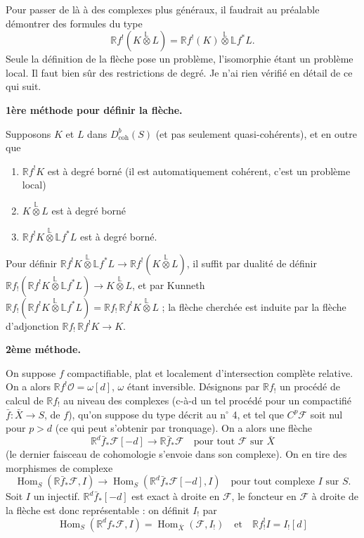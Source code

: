 \documentclass[12pt]{amsart}
\theoremstyle{plain}
\theoremstyle{definition}
\DeclareMathOperator{\Hom}{Hom}
\newcommand{\coh}{\text{coh}}
\newcommand{\cF}{\mathcal{F}}
\newcommand{\cO}{\mathcal{O}}
\newcommand{\cDb}{D^{b}}
\newcommand{\bR}{\mathbb{R}}
\newcommand{\bL}{\mathbb{L}}
\begin{document}
Pour passer de l\`a \`a des complexes plus g\'en\'eraux, il faudrait au pr\'ealable d\'emontrer des formules du type
\[
\bR f^{!}(K \overset{\mathbb{L}}{\otimes} L) = \bR f^{!}(K) \overset{\mathbb{L}}{\otimes} \bL f^{*}L.
\]
Seule la d\'efinition de la fl\`eche pose un probl\`eme, l'isomorphie \'etant un probl\`eme local. Il faut bien s\^ur des restrictions de degr\'e. Je n'ai rien v\'erifi\'e en d\'etail de ce qui suit.

\textbf{1\`ere m\'ethode pour d\'efinir la fl\`eche.}

Supposons $K$ et $L$ dans $\cDb_{\coh}(S)$ (et pas seulement quasi-coh\'erents), et en outre que
\begin{enumerate}
\item[a)] $\bR f^{!}K$ est \`a degr\'e born\'e (il est automatiquement coh\'erent, c'est un probl\`eme local)
\item[b)] $K \overset{\mathbb{L}}{\otimes} L$ est \`a degr\'e born\'e
\item[c)] $\bR f^{!}K \overset{\mathbb{L}}{\otimes} \bL f^{*}L$ est \`a degr\'e born\'e.
\end{enumerate}

Pour d\'efinir $\bR f^{!}K \overset{\mathbb{L}}{\otimes} \bL f^{*}L \to \bR f^{!}(K \overset{\mathbb{L}}{\otimes} L)$, il suffit par dualit\'e de d\'efinir $\bR f_{!}(\bR f^{!}K \overset{\mathbb{L}}{\otimes} \bL f^{*}L) \to K \overset{\mathbb{L}}{\otimes} L$, et par Kunneth $\bR f_{!}(\bR f^{!}K \overset{\mathbb{L}}{\otimes} \bL f^{*}L) = \bR f_{!}\,\bR f^{!}K \overset{\mathbb{L}}{\otimes} L$ ; la fl\`eche cherch\'ee est induite par la fl\`eche d'adjonction $\bR f_{!}\,\bR f^{!}K \to K$.

\textbf{2\`eme m\'ethode.}

On suppose $f$ compactifiable, plat et localement d'intersection compl\`ete relative. On a alors $\bR f^{!}\cO = \omega[d]$, $\omega$ \'etant inversible. D\'esignons par $\bR f_{!}$ un proc\'ed\'e de calcul de $\bR f_{!}$ au niveau des complexes (c-\`a-d un tel proc\'ed\'e pour un compactifi\'e $\bar{f}: \bar{X} \to S$, de $f$), qu'on suppose du type d\'ecrit au n$^{\circ}$ 4, et tel que $C^{p}\cF$ soit nul pour $p > d$ (ce qui peut s'obtenir par tronquage). On a alors une fl\`eche
\[
\bR^{d}\bar{f}_{*}\cF[-d] \to \bR\bar{f}_{*}\cF \quad \text{pour tout } \cF \text{ sur } \bar{X}
\]
(le dernier faisceau de cohomologie s'envoie dans son complexe). On en tire des morphismes de complexe
\[
\Hom_{S}(\bR\bar{f}_{*}\cF, I) \to \Hom_{S}(\bR^{d}\bar{f}_{*}\cF[-d], I) \quad \text{pour tout complexe } I \text{ sur } S.
\]
Soit $I$ un injectif. $\bR^{d}\bar{f}_{*}[-d]$ est exact \`a droite en $\cF$, le foncteur en $\cF$ \`a droite de la fl\`eche est donc repr\'esentable : on d\'efinit $I_{!}$ par
\[
\Hom_{S}(\bR^{d}f_{*}\cF, I) = \Hom_{\bar{X}}(\cF, I_{!}) \quad \text{et} \quad \bR f^{!}_{!}I = I_{!}[d]
\]
\end{document}
